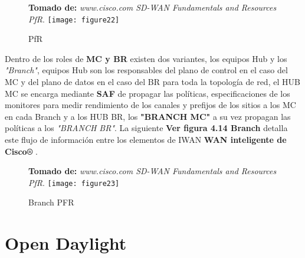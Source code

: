 \begin{figure}[htbp]
 \textbf{Tomado de:} \textit{www.cisco.com SD-WAN Fundamentals and Resources PfR}.
  \centering
    {\texttt{[image: figure22]}}%
  \caption{\footnotesize{PfR}}
  \label{fig:fig2subfig}
\end{figure}

Dentro de los roles de \textbf{MC y BR} existen dos variantes, los equipos Hub y los \textit{"Branch"}, equipos Hub son los responsables del plano de control en el caso del MC y del plano de datos en el caso del BR para toda la topología de red, el HUB MC se encarga mediante \textbf{SAF} de propagar las políticas, especificaciones de los monitores para medir rendimiento de los canales y prefijos de los sitios a los MC en cada Branch y a los HUB BR, los \textbf{"BRANCH MC"} a su vez propagan las políticas a los \textit{"BRANCH BR"}. La siguiente \textbf{Ver figura 4.14 Branch} detalla este flujo de información entre los elementos de IWAN \textbf{WAN inteligente de Cisco®} . 

\begin{figure}[htbp]
 \textbf{Tomado de:} \textit{www.cisco.com SD-WAN Fundamentals and Resources PfR}.
  \centering
    {\texttt{[image: figure23]}}%
  \caption{\footnotesize{Branch PFR}}
  \label{fig:fig2subfig}
\end{figure}
\section{Open Daylight}
\label{sec:Open Daylight}

